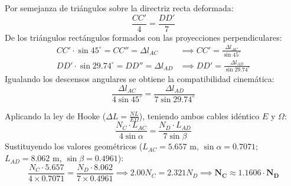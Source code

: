 {\begin{center}
{%
        }
    \end{center}

    Por semejanza de triángulos sobre la directriz recta deformada:
    \begin{equation}
        \frac{CC'}{4} = \frac{DD'}{7}
    \end{equation}
    De los triángulos rectángulos formados con las proyecciones perpendiculares:
    \begin{align}
        CC' \cdot \sin 45^\circ = CC'' = \Delta l_{AC}    & \implies CC' = \frac{\Delta l_{AC}}{\sin 45^\circ}    \\
        DD' \cdot \sin 29.74^\circ = DD'' = \Delta l_{AD} & \implies DD' = \frac{\Delta l_{AD}}{\sin 29.74^\circ}
    \end{align}
    Igualando los descensos angulares se obtiene la compatibilidad cinemática:
    \begin{equation}
        \frac{\Delta l_{AC}}{4 \sin 45^\circ} = \frac{\Delta l_{AD}}{7 \sin 29.74^\circ}
        \label{eq:compatibilidad_viga_dos_tirantes}
    \end{equation}


    Aplicando la ley de Hooke ($\Delta L = \frac{N L}{E \Omega}$), teniendo ambos cables idéntico $E$ y $\Omega$:
    \begin{equation}
        \frac{N_C \cdot L_{AC}}{4 \sin \alpha} = \frac{N_D \cdot L_{AD}}{7 \sin \beta}
    \end{equation}
    Sustituyendo los valores geométricos ($L_{AC} = 5.657\text{ m}$, $\sin \alpha = 0.7071$; $L_{AD} = 8.062\text{ m}$, $\sin \beta = 0.4961$):
    \begin{equation}
        \frac{N_C \cdot 5.657}{4 \times 0.7071} = \frac{N_D \cdot 8.062}{7 \times 0.4961} \implies 2.00 N_C = 2.321 N_D \implies \mathbf{N_C \approx 1.1606 \cdot N_D}
    \end{equation}

}
